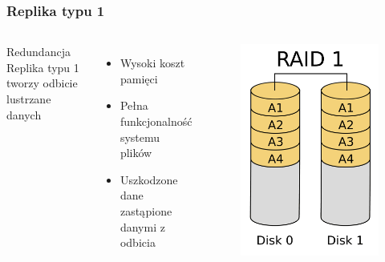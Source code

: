 \documentclass{beamer}
\begin{document}
\begin{frame}
	\frametitle{Replika typu 1}
	\begin{columns}
		\begin{block}{Redundancja}
			Replika typu 1 tworzy odbicie lustrzane danych
		\end{block}
		\begin{itemize}
			\item Wysoki koszt pamięci
			\item Pełna funkcjonalność systemu plików
			\item Uszkodzone dane zastąpione danymi z odbicia
		\end{itemize}
		\begin{figure}
			\includegraphics[scale=0.09]{raid-1.png}
		\end{figure}
	\end{columns}
\end{frame}
	
\end{document}
